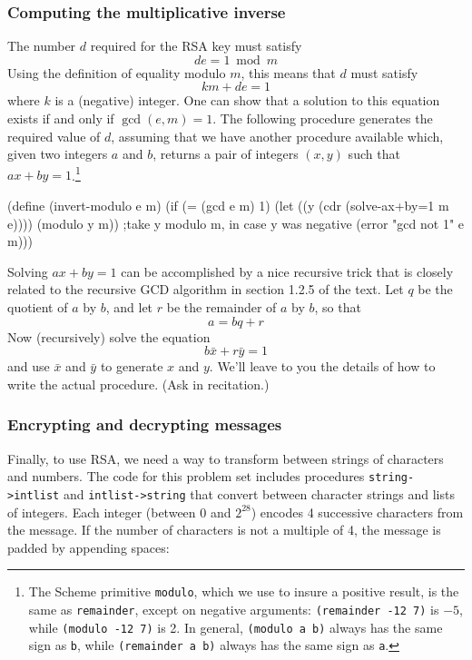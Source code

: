 \subsubsection{Computing the multiplicative inverse}

The number $d$ required for the RSA key must satisfy
\[de=1 \bmod m\]
Using the definition of equality modulo $m$, this means that $d$ must
satisfy
\[km + de=1\]
where $k$ is a (negative) integer.  One can show that a solution to
this equation exists if and only if $\gcd(e,m)=1$.  The following
procedure generates the required value of $d$, assuming that we have
another procedure available which, given two integers $a$ and $b$,
returns a pair of integers $(x,y)$ such that $ax+by=1$.\footnote{The
Scheme primitive {\tt modulo}, which we use to insure a positive
result, is the same as {\tt remainder}, except on negative arguments:
{\tt (remainder -12 7)} is $-5$, while {\tt (modulo -12 7)} is 2.  In
general, {\tt (modulo a b)} always has the same sign as {\tt b}, while
{\tt (remainder a b)} always has the same sign as {\tt a}.}

\beginlisp
(define (invert-modulo e m)
  (if (= (gcd e m) 1)
      (let ((y (cdr (solve-ax+by=1 m e))))
        (modulo y m))   ;take y modulo m, in case y was negative
      (error "gcd not 1" e m)))
\endlisp

Solving $ax+by=1$ can be accomplished by a nice recursive trick that
is closely related to the recursive GCD algorithm in section
1.2.5 of the text.  Let $q$ be the quotient of $a$ by $b$, and let
$r$ be the remainder of $a$ by $b$, so that
\[a=bq+r\]
Now (recursively) solve the equation
\[b\bar{x}+r\bar{y}=1\]
and use $\bar{x}$ and $\bar{y}$ to generate $x$ and $y$.  We'll leave
to you the details of how to write the actual procedure.  (Ask in
recitation.)

\subsubsection{Encrypting and decrypting messages}

Finally, to use RSA, we need a way to transform between strings of
characters and numbers.  The code for this problem set includes
procedures {\tt string->intlist} and {\tt intlist->string} that
convert between character strings and lists of integers.  Each integer
(between 0 and $2^{28}$) encodes 4 successive characters from the
message.  If the number of characters is not a multiple of 4, the
message is padded by appending spaces:

